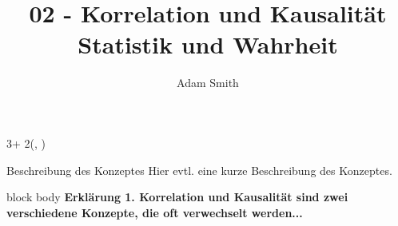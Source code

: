 \documentclass{beamer}
\title{02 - Korrelation und Kausalität \\
	\Large{Statistik und Wahrheit}}
\author{%
	Adam Smith
}
\date{}
\newlength{\blockOne}
\begin{document}


\begin{frame}[t]	%





\TPshowboxestrue




\begin{textblock*}{3\colwidth + 2\colsep}(\leftmargin, \blockOne)

\begin{alertblock}{%
	\begin{minipage}[b]{60pt}
		\RaggedRight
		\noindent\hspace{-10pt}
	\end{minipage}%
	\begin{minipage}[b]{3\colwidth+2\colsep-125pt}\strut%
		Beschreibung des Konzeptes \;
		{\mdseries Hier evtl. eine kurze Beschreibung des Konzeptes.}
	\end{minipage}%
}
	\vspace{-0.25cm}
	\begin{minipage}{\textwidth}
		\begin{beamercolorbox}[
			ht = 23.5cm, 
			wd = \linewidth, 
			left
		]{block body}
			\centering\textbf{\boldmath Erklärung 1.\; Korrelation und Kausalität sind zwei verschiedene Konzepte, die oft verwechselt werden...}\par
		\end{beamercolorbox}
	\end{minipage}%
	\vspace{0.5cm}
\end{alertblock}

\end{textblock*}


\end{frame}
\end{document}
